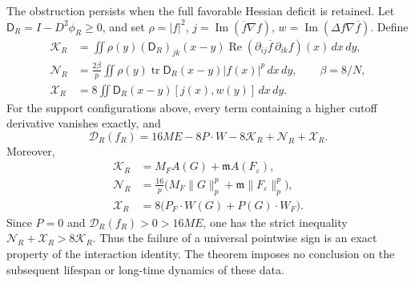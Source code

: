 \begin{remark}
\label{rem:r9-hessian-deficit}
The obstruction persists when the full favorable Hessian deficit
is retained. Let $\mathsf D_R=I-D^2\phi_R\ge0$, and set
$\rho=|f|^2$, $j=\operatorname{Im}(\overline f\nabla f)$,
$w=\operatorname{Im}(\Delta f\nabla\overline f)$. Define
\begin{align*}
 \mathcal K_R&=\iint\rho(y)(\mathsf D_R)_{jk}(x-y)
  \operatorname{Re}(\partial_{ij}\overline f\,\partial_{ik}f)(x)
  \,dx\,dy,\\
 \mathcal N_R&=\frac{2\beta}{p}\iint\rho(y)
  \operatorname{tr}\mathsf D_R(x-y)|f(x)|^p\,dx\,dy,
  \qquad\beta=8/N,\\
 \mathcal X_R&=8\iint\mathsf D_R(x-y)[j(x),w(y)]\,dx\,dy.
\end{align*}
For the support configurations above, every term containing a
higher cutoff derivative vanishes exactly, and
\[
 \mathcal D_R(f_R)=16ME-8P\cdot W
                  -8\mathcal K_R+\mathcal N_R+\mathcal X_R.
\]
Moreover,
\begin{align*}
 \mathcal K_R&=M_F A(G)+\mathfrak m A(F_\varepsilon),\\
 \mathcal N_R&=\frac{16}{p}
  \bigl(M_F\|G\|_p^p+\mathfrak m\|F_\varepsilon\|_p^p\bigr),\\
 \mathcal X_R&=8\bigl(P_F\cdot W(G)+P(G)\cdot W_F\bigr).
\end{align*}
Since $P=0$ and $\mathcal D_R(f_R)>0>16ME$, one has the strict
inequality $\mathcal N_R+\mathcal X_R>8\mathcal K_R$. Thus the
failure of a universal pointwise sign is an exact property of
the interaction identity. The theorem imposes no conclusion on
the subsequent lifespan or long-time dynamics of these data.
\end{remark}

